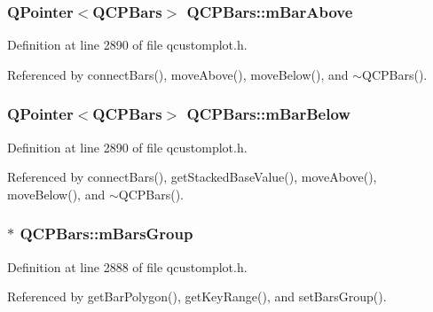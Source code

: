 \subsubsection[{m\+Bar\+Above}]{\setlength{\rightskip}{0pt plus 5cm}Q\+Pointer$<${\bf Q\+C\+P\+Bars}$>$ Q\+C\+P\+Bars\+::m\+Bar\+Above\hspace{0.3cm}{\ttfamily [protected]}}\label{class_q_c_p_bars_a0c1c46076c41a478dbb373cfd35929aa}


Definition at line 2890 of file qcustomplot.\+h.



Referenced by connect\+Bars(), move\+Above(), move\+Below(), and $\sim$\+Q\+C\+P\+Bars().

\hypertarget{class_q_c_p_bars_ad51db970eed7e286f2753b0216fc56de}{}
\subsubsection[{m\+Bar\+Below}]{\setlength{\rightskip}{0pt plus 5cm}Q\+Pointer$<${\bf Q\+C\+P\+Bars}$>$ Q\+C\+P\+Bars\+::m\+Bar\+Below\hspace{0.3cm}{\ttfamily [protected]}}\label{class_q_c_p_bars_ad51db970eed7e286f2753b0216fc56de}


Definition at line 2890 of file qcustomplot.\+h.



Referenced by connect\+Bars(), get\+Stacked\+Base\+Value(), move\+Above(), move\+Below(), and $\sim$\+Q\+C\+P\+Bars().

\hypertarget{class_q_c_p_bars_a9f59c255f3739182ca9744dff75beaa9}{}
\subsubsection[{m\+Bars\+Group}]{$\ast$ Q\+C\+P\+Bars\+::m\+Bars\+Group\hspace{0.3cm}{\ttfamily [protected]}}\label{class_q_c_p_bars_a9f59c255f3739182ca9744dff75beaa9}


Definition at line 2888 of file qcustomplot.\+h.



Referenced by get\+Bar\+Polygon(), get\+Key\+Range(), and set\+Bars\+Group().

